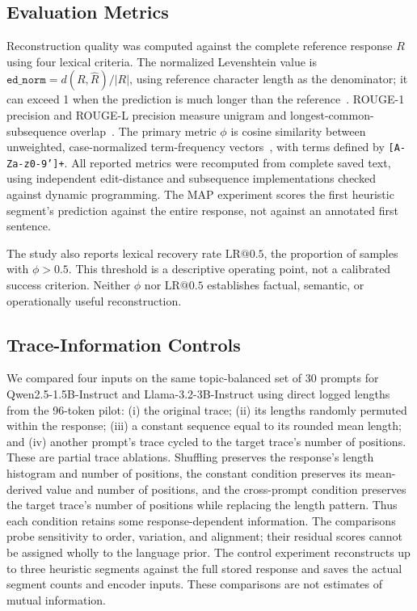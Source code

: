 \documentclass[electronics,article,submit,pdftex,moreauthors]{Definitions/mdpi}
\begin{document}
\subsection{Evaluation Metrics}
Reconstruction quality was computed against the complete reference response $R$ using four lexical criteria. The normalized Levenshtein value is $\texttt{ed\_norm}=d(R,\widehat{R})/|R|$, using reference character length as the denominator; it can exceed 1 when the prediction is much longer than the reference~\cite{levenshtein1966binary}. ROUGE-1 precision and ROUGE-L precision measure unigram and longest-common-subsequence overlap~\cite{lin2004rouge}. The primary metric $\phi$ is cosine similarity between unweighted, case-normalized term-frequency vectors~\cite{salton1975vector}, with terms defined by \texttt{[A-Za-z0-9']+}. All reported metrics were recomputed from complete saved text, using independent edit-distance and subsequence implementations checked against dynamic programming. The MAP experiment scores the first heuristic segment's prediction against the entire response, not against an annotated first sentence.

The study also reports lexical recovery rate $\mathrm{LR}@0.5$, the proportion of samples with $\phi>0.5$. This threshold is a descriptive operating point, not a calibrated success criterion. Neither $\phi$ nor $\mathrm{LR}@0.5$ establishes factual, semantic, or operationally useful reconstruction.

\subsection{Trace-Information Controls}
We compared four inputs on the same topic-balanced set of 30 prompts for Qwen2.5-1.5B-Instruct and Llama-3.2-3B-Instruct using direct logged lengths from the 96-token pilot: (i) the original trace; (ii) its lengths randomly permuted within the response; (iii) a constant sequence equal to its rounded mean length; and (iv) another prompt's trace cycled to the target trace's number of positions. These are partial trace ablations. Shuffling preserves the response's length histogram and number of positions, the constant condition preserves its mean-derived value and number of positions, and the cross-prompt condition preserves the target trace's number of positions while replacing the length pattern. Thus each condition retains some response-dependent information. The comparisons probe sensitivity to order, variation, and alignment; their residual scores cannot be assigned wholly to the language prior. The control experiment reconstructs up to three heuristic segments against the full stored response and saves the actual segment counts and encoder inputs. These comparisons are not estimates of mutual information.
\end{document}
